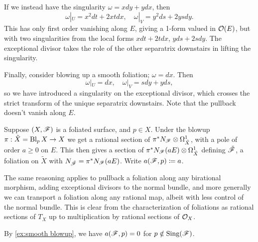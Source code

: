 \begin{example}
    If we instead have the singularity $\omega=xdy+ydx$, then
    \begin{equation*}
        \omega|_U = x^2dt + 2xtdx, \quad
        \omega|_V = y^2ds+2ysdy.
    \end{equation*}
    This has only first order vanishing along $E$, giving a 1-form valued in
    $\mathcal{O}(E)$, but with two singularities from the local forms $xdt+2tdx$,
    $yds+2sdy$. The exceptional divisor takes the role of the other separatrix
    downstairs in lifting the singularity.
\end{example}

\begin{example}\label{ex:smooth blowup}
    Finally, consider blowing up a smooth foliation; $\omega=dx$. Then
    \begin{equation*}
        \omega|_U = dx, \quad \omega|_V = sdy+yds,
    \end{equation*}
    so we have introduced a singularity on the exceptional divisor, which
    crosses the strict transform of the unique separatrix downstairs. Note that
    the pullback doesn't vanish along $E$.
\end{example}

\begin{definition}
    Suppose $(X,\mathscr{F})$ is a foliated surface, and $p\in X$. Under the blowup
    $\pi:\tilde X=\operatorname{Bl}_pX\to X$ we get a rational section of
    $\pi^*N_{\mathscr{F}}\otimes\Omega^1_{\tilde X}$, with a pole of order $a\ge0$ on
    $E$. This then gives a section of
    $\pi^*N_{\mathscr{F}}(aE)\otimes\Omega^1_{\tilde X}$ defining $\tilde{\mathscr{F}}$, a
    foliation on $\tilde X$ with $N_{\tilde{\mathscr{F}}}=\pi^*N_{\mathscr{F}}(aE)$. Write
    $a(\mathscr{F},p)\coloneqq a$.
\end{definition}

\begin{remark}
    The same reasoning applies to pullback a foliation along any birational
    morphism, adding exceptional divisors to the normal bundle, and more
    generally we can transport a foliation along any rational map, albeit with
    less control of the normal bundle. This is clear from the characterization
    of foliations as rational sections of $T_X$ up to multiplication by rational
    sections of $\mathcal{O}_X$.
\end{remark}

\begin{remark}
    By \cref{ex:smooth blowup}, we have $a(\mathscr{F},p)=0$ for
    $p\notin\operatorname{Sing}(\mathscr{F})$.
\end{remark}

